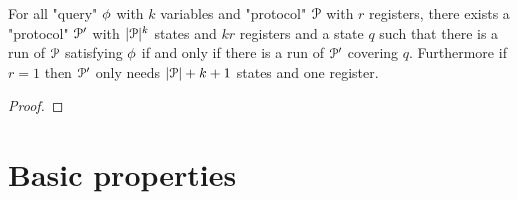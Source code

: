 \begin{lemma}
	For all "query" $\phi$ with $k$ variables and "protocol" $\mathcal{P}$ with $r$ registers, there exists a "protocol" $\mathcal{P}'$ with $|\mathcal{P}|^k$ states and $kr$ registers and a state $q$ such that there is a run of $\mathcal{P}$ satisfying $\phi$ if and only if there is a run of $\mathcal{P}'$ covering $q$.
	Furthermore if $r = 1$ then $\mathcal{P}'$ only needs $|\mathcal{P}|+k+1$ states and one register.
\end{lemma}

\ifproofs
\begin{proof}
\end{proof}
\fi
	
	
\ifbasic
\section{Basic properties}

%


